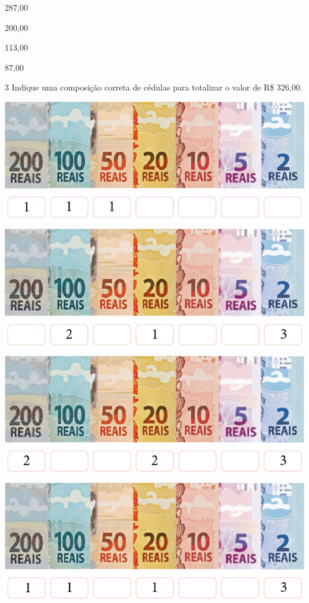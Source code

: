 \begin{escolha}[itemsep=-5pt]
\item 287,00

\item 200,00

\item 113,00

\item 87,00
\end{escolha}

\num{3} Indique uma composição correta de cédulas para totalizar o valor de R\$ 326,00.

\begin{escolha}[itemsep=-5pt]
\item \includegraphics[width=.7\textwidth]{./media/image80.png}

\item \includegraphics[width=.7\textwidth]{./media/image81.png}

\item \includegraphics[width=.7\textwidth]{./media/image82.png}

\item \includegraphics[width=.7\textwidth]{./media/image83.png}
\end{escolha}


